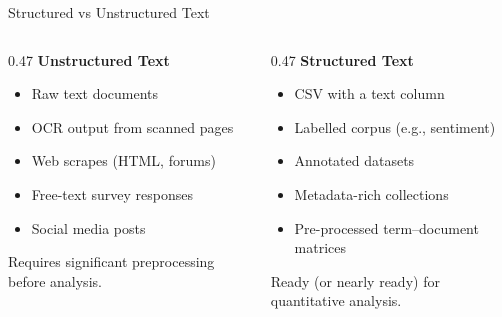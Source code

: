 \documentclass[aspectratio=169]{beamer}
\begin{document}
\begin{frame}{Structured vs Unstructured Text}
    \begin{columns}[T]
        \begin{column}{0.47\textwidth}
            \textbf{\color{sgsssMagenta} Unstructured Text}
            \begin{itemize}
                \item Raw text documents
                \item OCR output from scanned pages
                \item Web scrapes (HTML, forums)
                \item Free-text survey responses
                \item Social media posts
            \end{itemize}
            \vspace{0.3cm}
            {\small Requires significant preprocessing before analysis.}
        \end{column}
        \begin{column}{0.47\textwidth}
            \textbf{\color{sgsssGreen} Structured Text}
            \begin{itemize}
                \item CSV with a text column
                \item Labelled corpus (e.g., sentiment)
                \item Annotated datasets
                \item Metadata-rich collections
                \item Pre-processed term--document matrices
            \end{itemize}
            \vspace{0.3cm}
            {\small Ready (or nearly ready) for quantitative analysis.}
        \end{column}
    \end{columns}
\end{frame}
\end{document}
